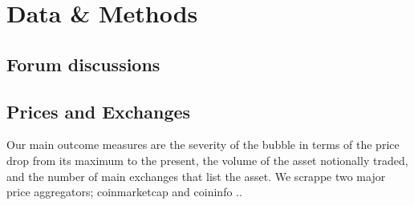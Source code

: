 \section{Data \& Methods}

\subsection{Forum discussions}



\subsection{Prices and Exchanges}

Our main outcome measures are the severity of the bubble in terms of the price drop from its maximum to the present, the volume of the asset notionally traded, and the number of main exchanges that list the asset.
We scrappe two major price aggregators; coinmarketcap and coininfo ..
